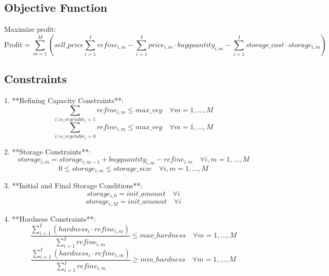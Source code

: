 \documentclass{article}
\begin{document}
\subsection*{Objective Function}
Maximize profit:
\[
\text{Profit} = \sum_{m=1}^{M} \left( sell\_price \sum_{i=1}^{I} refine_{i,m} - \sum_{i=1}^{I} price_{i,m} \cdot buyquantity_{i,m} - \sum_{i=1}^{I} storage\_cost \cdot storage_{i,m} \right)
\]

\subsection*{Constraints}
1. **Refining Capacity Constraints**:
   \[
   \sum_{i: is\_vegetable_i = 1} refine_{i,m} \leq max\_veg \quad \forall m = 1, \ldots, M
   \]
   \[
   \sum_{i: is\_vegetable_i = 0} refine_{i,m} \leq max\_veg \quad \forall m = 1, \ldots, M
   \]

2. **Storage Constraints**:
   \[
   storage_{i,m} = storage_{i,m-1} + buyquantity_{i,m} - refine_{i,m} \quad \forall i, m = 1, \ldots, M
   \]
   \[
   0 \leq storage_{i,m} \leq storage\_size \quad \forall i, m = 1, \ldots, M
   \]

3. **Initial and Final Storage Conditions**:
   \[
   storage_{i,0} = init\_amount \quad \forall i
   \]
   \[
   storage_{i,M} = init\_amount \quad \forall i
   \]

4. **Hardness Constraints**:
   \[
   \frac{\sum_{i=1}^{I} (hardness_{i} \cdot refine_{i,m})}{\sum_{i=1}^{I} refine_{i,m}} \leq max\_hardness \quad \forall m = 1, \ldots, M
   \]
   \[
   \frac{\sum_{i=1}^{I} (hardness_{i} \cdot refine_{i,m})}{\sum_{i=1}^{I} refine_{i,m}} \geq min\_hardness \quad \forall m = 1, \ldots, M
   \]
\end{document}
